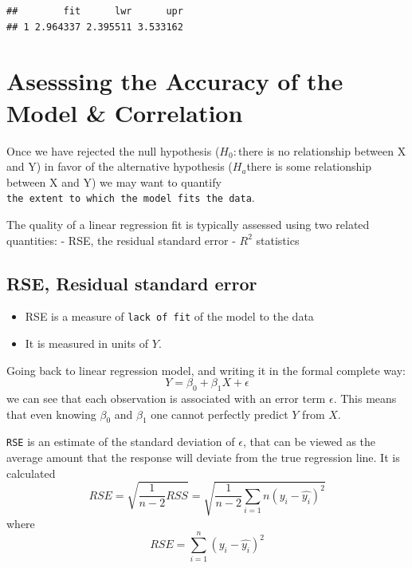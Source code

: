 \documentclass[]{article}
\providecommand{\tightlist}{%
  \setlength{\itemsep}{0pt}\setlength{\parskip}{0pt}}
\begin{document}
\begin{verbatim}
##        fit      lwr      upr
## 1 2.964337 2.395511 3.533162
\end{verbatim}

\hypertarget{asesssing-the-accuracy-of-the-model-correlation}{%
\section{Asesssing the Accuracy of the Model \&
Correlation}\label{asesssing-the-accuracy-of-the-model-correlation}}

Once we have rejected the null hypothesis (\(H_0:\)there is no
relationship between X and Y) in favor of the alternative hypothesis
(\(H_a\)there is some relationship between X and Y) we may want to
quantify \texttt{the\ extent\ to\ which\ the\ model\ fits\ the\ data}.

The quality of a linear regression fit is typically assessed using two
related quantities: - RSE, the residual standard error - \(R^2\)
statistics

\hypertarget{rse-residual-standard-error}{%
\subsection{RSE, Residual standard
error}\label{rse-residual-standard-error}}

\begin{itemize}
\tightlist
\item
  RSE is a measure of \texttt{lack\ of\ fit} of the model to the data
\item
  It is measured in units of \(Y\).
\end{itemize}

Going back to linear regression model, and writing it in the formal
complete way: \[Y=\beta_0+\beta_1X+\epsilon\] we can see that each
observation is associated with an error term \(\epsilon\). This means
that even knowing \(\beta_0\) and \(\beta_1\) one cannot perfectly
predict \(Y\) from \(X\).

\texttt{RSE} is an estimate of the standard deviation of \(\epsilon\),
that can be viewed as the average amount that the response will deviate
from the true regression line. It is calculated
\[RSE=\sqrt{\frac{1}{n-2}RSS} = \sqrt{\frac{1}{n-2}\sum_{i=1}{n}(y_i-\hat{y_i})^2}\]
where \[RSE=\sum_{i=1}^{n}(y_i-\hat{y_i})^2\]
\end{document}
